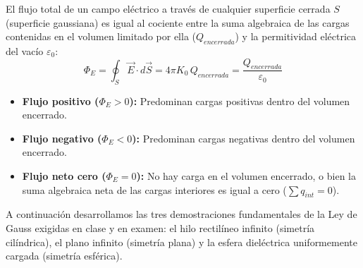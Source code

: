 \begin{ley}
El flujo total de un campo eléctrico a través de cualquier superficie cerrada $S$ (superficie gaussiana) es igual al cociente entre la suma algebraica de las cargas contenidas en el volumen limitado por ella ($Q_{encerrada}$) y la permitividad eléctrica del vacío $\varepsilon_0$:
\begin{equation}
    \Phi_E = \oint_S \vec{E} \cdot d\vec{S} = 4\pi K_0\, Q_{encerrada} = \frac{Q_{encerrada}}{\varepsilon_0}
\end{equation}
\begin{itemize}[leftmargin=*]
    \item \textbf{Flujo positivo ($\Phi_E > 0$):} Predominan cargas positivas dentro del volumen encerrado.
    \item \textbf{Flujo negativo ($\Phi_E < 0$):} Predominan cargas negativas dentro del volumen encerrado.
    \item \textbf{Flujo neto cero ($\Phi_E = 0$):} No hay carga en el volumen encerrado, o bien la suma algebraica neta de las cargas interiores es igual a cero ($\sum q_{int} = 0$).
\end{itemize}
\end{ley}

A continuación desarrollamos las tres demostraciones fundamentales de la Ley de Gauss exigidas en clase y en examen: el hilo rectilíneo infinito (simetría cilíndrica), el plano infinito (simetría plana) y la esfera dieléctrica uniformemente cargada (simetría esférica).

